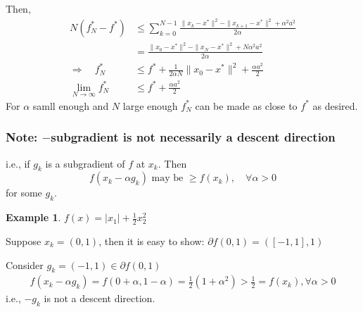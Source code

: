 \documentclass[11pt,a4paper]{article}
\newtheorem{example}{Example}
\begin{document}
Then,
\begin{equation}
    \begin{aligned}
        N(f_N^*-f^*)&\leq \sum_{k=0}^{N-1}\frac{\|x_k-x^*\|^2-\|x_{k+1}-x^*\|^2+\alpha^2a^2}{2\alpha}\\
        &=\frac{\|x_0-x^*\|^2-\|x_{N}-x^*\|^2+N\alpha^2a^2}{2\alpha}\\
        \Rightarrow\quad f_N^*&\leq f^*+\frac{1}{2\alpha N}\|x_0-x^*\|^2+\frac{\alpha a^2}{2}\\
        \lim_{N \rightarrow	\infty} f_N^*&\leq f^*+\frac{\alpha a^2}{2}
    \end{aligned}
    \nonumber
\end{equation}
For $\alpha$ samll enough and $N$ large enough $f^*_N$ can be made as close to $f^*$ as desired.

\subsubsection*{Note: $-$subgradient is not necessarily a descent direction}
i.e., if $g_k$ is a subgradient of $f$ at $x_k$. Then $$f(x_k-\alpha g_k)\text{ may be }\geq f(x_k),\quad \forall \alpha>0$$
for some $g_k$.

\begin{example}
    $f(x)=|x_1|+\frac{1}{2}x_2^2$
\end{example}
Suppose $x_k=(0,1)$, then it is easy to show: $\partial f(0,1)=([-1,1],1)$

Consider $g_k=(-1,1)\in\partial f(0,1)$
\begin{equation}
    \begin{aligned}
        f(x_k-\alpha g_k)=f(0+\alpha,1-\alpha)=\frac{1}{2}(1+\alpha^2)>\frac{1}{2}=f(x_k),\forall \alpha>0
    \end{aligned}
    \nonumber
\end{equation}
i.e., $-g_k$ is not a descent direction.

\begin{center}
\end{center}
\end{document}
